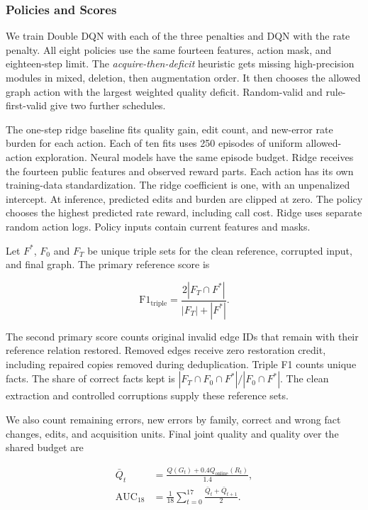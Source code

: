 \subsubsection{Policies and Scores}

We train Double DQN with each of the three penalties and DQN with
the rate penalty. All eight policies use the same fourteen features,
action mask, and eighteen-step limit.
The \emph{acquire-then-deficit} heuristic gets missing high-precision
modules in mixed, deletion, then augmentation order. It then chooses
the allowed graph action with the largest weighted quality deficit.
Random-valid and rule-first-valid give two further schedules.

The one-step ridge baseline fits quality gain, edit count, and new-error
rate burden for each action. Each of ten fits uses 250 episodes of
uniform allowed-action exploration. Neural models have the same episode
budget. Ridge receives the fourteen public features and observed reward
parts. Each action has its own training-data standardization.
The ridge coefficient is one, with an unpenalized intercept.
At inference, predicted edits and burden are clipped at zero.
The policy chooses the highest predicted rate reward, including call cost.
Ridge uses separate random action logs. Policy inputs contain current
features and masks.

Let $F^*$, $F_0$ and $F_T$ be unique triple sets for the clean reference,
corrupted input, and final graph. The primary reference score is

\begin{equation}
\mathrm{F1}_{\mathrm{triple}}=\frac{2|F_T\cap F^*|}{|F_T|+|F^*|}.
\end{equation}

The second primary score counts original invalid edge IDs that remain
with their reference relation restored. Removed edges receive zero
restoration credit, including repaired copies removed during deduplication.
Triple F1 counts unique facts. The share of correct facts kept is
$|F_T\cap F_0\cap F^*|/|F_0\cap F^*|$. The clean extraction and controlled
corruptions supply these reference sets.

We also count remaining errors, new errors by family, correct and wrong
fact changes, edits, and acquisition units. Final joint quality and
quality over the shared budget are

\begin{equation}
\begin{aligned}
\bar Q_t&=\frac{Q(G_t)+0.4Q_{\mathrm{online}}(R_t)}{1.4},\\
\mathrm{AUC}_{18}&=\frac1{18}\sum_{t=0}^{17}\frac{\bar Q_t+\bar Q_{t+1}}2.
\end{aligned}
\end{equation}

